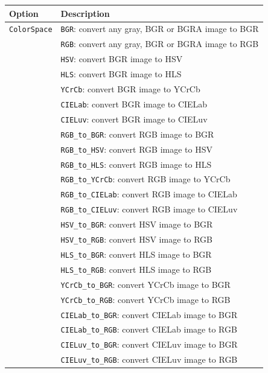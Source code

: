 \documentclass[a4paper,11pt,oneside]{article}
\begin{document}
\begin{center}
 \begin{tabular}{| p{5cm} | p{10cm} | }
 \hline
 Option & Description\\
 \hline\hline
  \cellcolor{requiredcolor}\lstinline!ColorSpace!
 & \lstinline!BGR!: convert any gray, BGR or BGRA image to BGR \\
 & \lstinline!RGB!: convert any gray, BGR or BGRA image to RGB \\
 & \lstinline!HSV!: convert BGR image to HSV \\
 & \lstinline!HLS!: convert BGR image to HLS \\
 & \lstinline!YCrCb!: convert BGR image to YCrCb \\
 & \lstinline!CIELab!: convert BGR image to CIELab \\
 & \lstinline!CIELuv!: convert BGR image to CIELuv \\
 & \lstinline!RGB_to_BGR!: convert RGB image to BGR \\
 & \lstinline!RGB_to_HSV!: convert RGB image to HSV \\
 & \lstinline!RGB_to_HLS!: convert RGB image to HLS \\
 & \lstinline!RGB_to_YCrCb!: convert RGB image to YCrCb \\
 & \lstinline!RGB_to_CIELab!: convert RGB image to CIELab \\
 & \lstinline!RGB_to_CIELuv!: convert RGB image to CIELuv \\
 & \lstinline!HSV_to_BGR!: convert HSV image to BGR \\
 & \lstinline!HSV_to_RGB!: convert HSV image to RGB \\
 & \lstinline!HLS_to_BGR!: convert HLS image to BGR \\
 & \lstinline!HLS_to_RGB!: convert HLS image to RGB \\
 & \lstinline!YCrCb_to_BGR!: convert YCrCb image to BGR \\
 & \lstinline!YCrCb_to_RGB!: convert YCrCb image to RGB \\
 & \lstinline!CIELab_to_BGR!: convert CIELab image to BGR \\
 & \lstinline!CIELab_to_RGB!: convert CIELab image to RGB \\
 & \lstinline!CIELuv_to_BGR!: convert CIELuv image to BGR \\
 & \lstinline!CIELuv_to_RGB!: convert CIELuv image to RGB \\
 \hline
\end{tabular}
\end{center}
\end{document}
